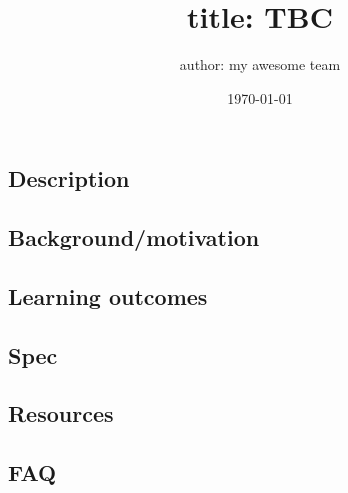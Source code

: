 \documentclass[a4paper,fontsize=12pt]{scrartcl}
\author{author: my awesome team}
\date{\today}
\title{title: TBC}
\begin{document}

\hypertarget{description}{%
\subsection{Description}\label{description}}

\vspace{0.5\textheight}

\hypertarget{backgroundmotivation}{%
\subsection{Background/motivation}\label{backgroundmotivation}}

\clearpage

\hypertarget{learning-outcomes}{%
\subsection{Learning outcomes}\label{learning-outcomes}}

\vspace{0.5\textheight}

\hypertarget{spec}{%
\subsection{Spec}\label{spec}}

\clearpage

\hypertarget{resources}{%
\subsection{Resources}\label{resources}}

\vspace{0.5\textheight}

\hypertarget{faq}{%
\subsection{FAQ}\label{faq}}
\end{document}
